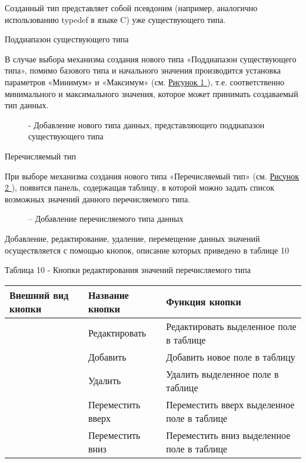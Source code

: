 \documentclass[letterpaper,10pt,russian]{sphinxmanual}
\begin{document}
Созданный тип представляет собой псевдоним (например, аналогично
использованию typedef в языке C) уже существующего типа.

Поддиапазон существующего типа

В случае выбора механизма создания нового типа «Поддиапазон
существующего типа», помимо базового типа и начального значения
производится установка параметров «Минимум» и «Максимум» (см. \hyperref[usage_guide/ide_components:image119]{Рисунок \ref{usage_guide/ide_components:image119} }),
т.е. соответственно минимального и максимального значения, которое может
принимать создаваемый тип данных.
\begin{figure}[htbp]
\centering
\capstart

\noindent{}
\caption{- Добавление нового типа данных, представляющего поддиапазон существующего типа}\label{usage_guide/ide_components:image119}\end{figure}

Перечисляемый тип

При выборе механизма создания нового типа «Перечисляемый тип»
(см. \hyperref[usage_guide/ide_components:image120]{Рисунок \ref{usage_guide/ide_components:image120} }), появится панель,
содержащая таблицу, в которой можно задать список
возможных значений данного перечисляемого типа.
\begin{figure}[htbp]
\centering
\capstart

\noindent{}
\caption{– Добавление перечисляемого типа данных}\label{usage_guide/ide_components:image120}\end{figure}

Добавление, редактирование, удаление, перемещение данных значений
осуществляется с помощью кнопок, описание которых приведено в таблице 10

Таблица 10 - Кнопки редактирования значений перечисляемого типа

\noindent\begin{tabulary}{\linewidth}{|L|L|L|}
\hline
\textsf{\relax 
Внешний вид кнопки
\unskip}\relax &\textsf{\relax 
Название кнопки
\unskip}\relax &\textsf{\relax 
Функция кнопки
\unskip}\relax \\
\hline
{}
&
Редактировать
&
Редактировать
выделенное поле в
таблице
\\
\hline
{}
&
Добавить
&
Добавить новое поле в
таблицу
\\
\hline
{}
&
Удалить
&
Удалить выделенное
поле в таблице
\\
\hline
{}
&
Переместить вверх
&
Переместить вверх
выделенное поле в
таблице
\\
\hline
{}
&
Переместить вниз
&
Переместить вниз
выделенное поле в
таблице
\\
\hline\end{tabulary}
\end{document}
